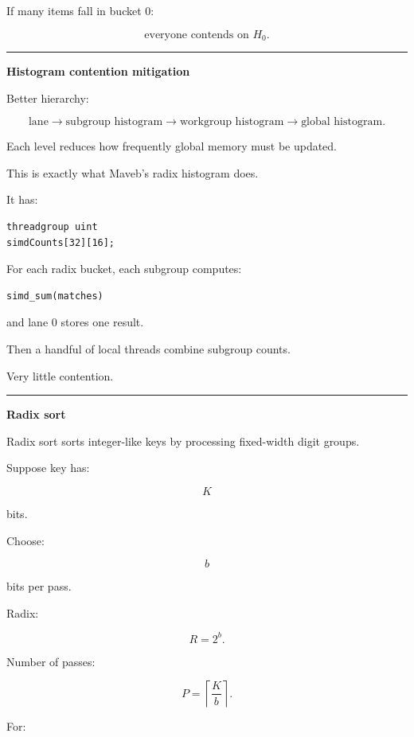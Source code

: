 If many items fall in bucket 0:

\[
\text{everyone contends on }H_0.
\]

\begin{center}\rule{0.5\linewidth}{0.5pt}\end{center}

\textbf{Histogram contention mitigation}

Better hierarchy:

\[
\text{lane}
\rightarrow
\text{subgroup histogram}
\rightarrow
\text{workgroup histogram}
\rightarrow
\text{global histogram}.
\]

Each level reduces how frequently global memory must be updated.

This is exactly what Maveb's radix histogram does.

It has:

\protect{}\label{ctu20l}%
\begin{verbatim}
threadgroup uint
simdCounts[32][16];
\end{verbatim}

For each radix bucket, each subgroup computes:

\protect{}\label{6uv2yi}%
\begin{verbatim}
simd_sum(matches)
\end{verbatim}

and lane 0 stores one result.

Then a handful of local threads combine subgroup counts.

Very little contention.

\begin{center}\rule{0.5\linewidth}{0.5pt}\end{center}

\textbf{Radix sort}

Radix sort sorts integer-like keys by processing fixed-width digit groups.

Suppose key has:

\[
K
\]

bits.

Choose:

\[
b
\]

bits per pass.

Radix:

\[
R=2^b.
\]

Number of passes:

\[
\boxed{
P=
\left\lceil
\frac Kb
\right\rceil.
}
\]

For:

